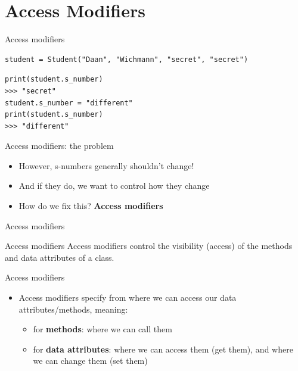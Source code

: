 \section{Access Modifiers}

\begin{frame}[fragile]{Access modifiers}
\pause
\begin{verbatim}
student = Student("Daan", "Wichmann", "secret", "secret")
\end{verbatim}
\pause
\begin{verbatim}
print(student.s_number)
>>> "secret"
student.s_number = "different"
print(student.s_number)
>>> "different"
\end{verbatim}
\end{frame}

\begin{frame}{Access modifiers: the problem}
\begin{itemize}
    \item However, s-numbers generally shouldn't change!
    \item And if they do, we want to control how they change
    \item How do we fix this? \textbf{Access modifiers}
\end{itemize}
\end{frame}

\begin{frame}{Access modifiers}
    \begin{block}{Access modifiers}
        Access modifiers control the visibility (access) of the methods and data attributes of a class.
    \end{block}
\end{frame}

\begin{frame}{Access modifiers}
\begin{itemize}
    \item Access modifiers specify from where we can access our data attributes/methods, meaning:
    \begin{itemize}
        \item for \textbf{methods}: where we can call them
        \item for \textbf{data attributes}: where we can access them (get them), and where we can change them (set them)
    \end{itemize}
\end{itemize}
\end{frame}

